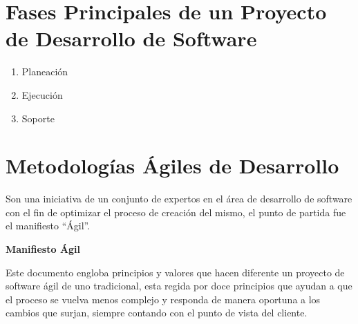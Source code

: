 \documentclass[10pt,a4paper]{article}
\begin{document}
\section{Fases Principales de un Proyecto de Desarrollo de Software}
\begin{enumerate}
	\renewcommand{\theenumi}{\Alph{enumi}}
	\item Planeaci\'on
	\item Ejecuci\'on
	
	\item Soporte
	
\end{enumerate}

\section{Metodolog\'ias \'Agiles de Desarrollo}
Son una iniciativa de un conjunto de expertos en el \'area de desarrollo de software con el fin de optimizar el proceso de creaci\'on del mismo, el punto de partida fue el manifiesto ``\'Agil''. \\ \par

\textbf{Manifiesto \'Agil}\\ \par
Este documento engloba principios y valores que hacen diferente un proyecto de software \'agil de uno tradicional, esta regida por doce principios que ayudan a que el proceso se vuelva menos complejo y responda de manera oportuna a los cambios que surjan, siempre contando con el punto de vista del cliente. \par
\end{document}
